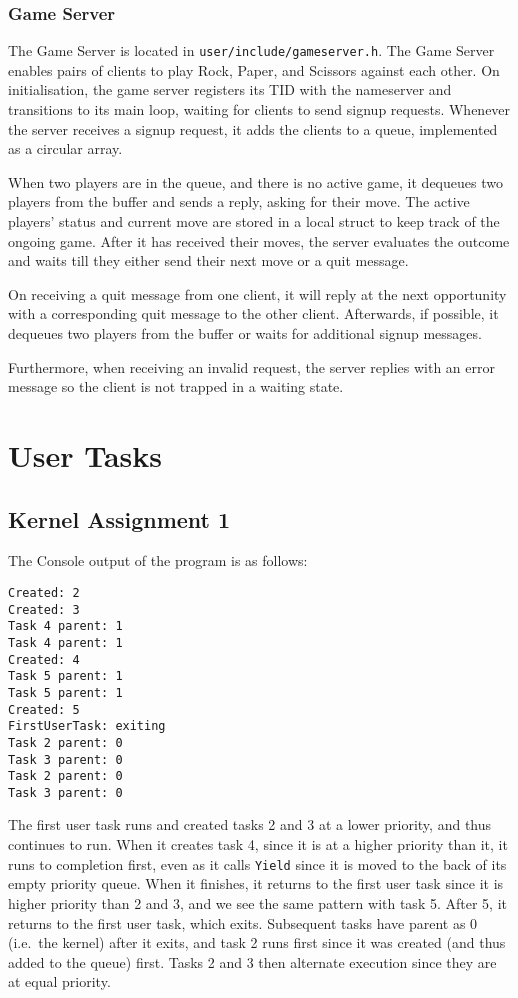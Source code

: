 \documentclass[12pt, titlepage]{article}
\begin{document}
    \subsubsection{Game Server}
    The Game Server is located in \verb`user/include/gameserver.h`.
    The Game Server enables pairs of clients to play Rock, Paper, and Scissors against each other.
    On initialisation, the game server registers its TID with the nameserver and transitions to its main loop, waiting for clients to send signup requests.
    Whenever the server receives a signup request, it adds the clients to a queue, implemented as a circular array.

    When two players are in the queue, and there is no active game, it dequeues two players from the buffer and sends a reply, asking for their move.
    The active players' status and current move are stored in a local struct to keep track of the ongoing game.
    After it has received their moves, the server evaluates the outcome and waits till they either send their next move or a quit message.

    On receiving a quit message from one client, it will reply at the next opportunity with a corresponding quit message to the other client.
    Afterwards, if possible, it dequeues two players from the buffer or waits for additional signup messages.

    Furthermore, when receiving an invalid request, the server replies with an error message so the client is not trapped in a waiting state.

    \section{User Tasks}

    \subsection{Kernel Assignment 1}
    The Console output of the program is as follows:
    \begin{verbatim}
Created: 2
Created: 3
Task 4 parent: 1
Task 4 parent: 1
Created: 4
Task 5 parent: 1
Task 5 parent: 1
Created: 5
FirstUserTask: exiting
Task 2 parent: 0
Task 3 parent: 0
Task 2 parent: 0
Task 3 parent: 0
    \end{verbatim}
    The first user task runs and created tasks 2 and 3 at a lower priority, and thus continues to run. When it creates task 4, since it is at a higher priority than it, it runs to completion first, even as it calls \verb`Yield` since it is moved to the back of its empty priority queue. When it finishes, it returns to the first user task since it is higher priority than 2 and 3, and we see the same pattern with task 5. After 5, it returns to the first user task, which exits. Subsequent tasks have parent as 0 (i.e.\ the kernel) after it exits, and task 2 runs first since it was created (and thus added to the queue) first. Tasks 2 and 3 then alternate execution since they are at equal priority.
\end{document}
